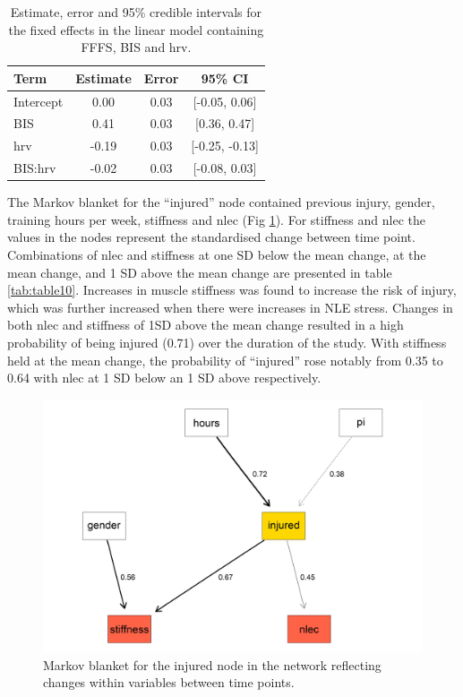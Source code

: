 \documentclass[
  english,
  man,floatsintext]{apa6}
\begin{document}
\begin{table}[H]

\caption{\label{tab:table9}Estimate, error and 95\% credible intervals for the fixed effects in the linear model containing FFFS, BIS and hrv.}
\centering
\begin{tabular}[t]{l|c|c|c}
\hline
\textbf{Term} & \textbf{Estimate} & \textbf{Error} & \textbf{95\% CI}\\
\hline
Intercept & 0.00 & 0.03 & [-0.05, 0.06]\\
\hline
BIS & 0.41 & 0.03 & [0.36, 0.47]\\
\hline
hrv & -0.19 & 0.03 & [-0.25, -0.13]\\
\hline
BIS:hrv & -0.02 & 0.03 & [-0.08, 0.03]\\
\hline
\end{tabular}
\end{table}

The Markov blanket for the ``injured'' node contained previous injury, gender, training hours per week, stiffness and nlec (Fig \ref{fig:fig10}).
For stiffness and nlec the values in the nodes represent the standardised change between time point.
Combinations of nlec and stiffness at one SD below the mean change, at the mean change, and 1 SD above the mean change are presented in table \ref{tab:table10}.
Increases in muscle stiffness was found to increase the risk of injury, which was further increased when there were increases in NLE stress.
Changes in both nlec and stiffness of 1SD above the mean change resulted in a high probability of being injured (0.71) over the duration of the study.
With stiffness held at the mean change, the probability of ``injured'' rose notably from 0.35 to 0.64 with nlec at 1 SD below an 1 SD above respectively.

\begin{figure}

{\centering \includegraphics[width=1\linewidth]{figures_doc/Fig10} 

}

\caption{Markov blanket for the injured node in the network reflecting changes within variables between time points.}\label{fig:fig10}
\end{figure}
\end{document}
